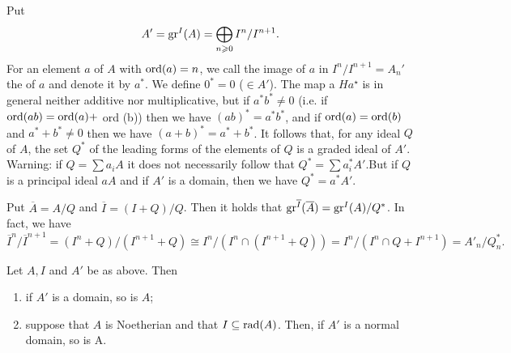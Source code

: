 \documentclass[../main]{subfiles}
\begin{document}
Put \[A'=\operatorname{gr}^I(A) = \bigoplus_{n\geqslant 0} I^n/I^{n+1}.\] For an element $a$ of $A$ with $\operatorname{ord}(a)=n$, we call the image of $a$ in $I^n / I^{n+1}=A_n'$ the  of $a$ and denote it by $a^{\ast}$. We define $0^{\ast}=0$ ($\in A'$). The map a $H a^{\star}$ is in general neither additive nor multiplicative, but if $a^{\ast} b^{\ast} \neq 0$ (i.e. if $\operatorname{ord}(a b)=\operatorname{ord}(a)+$ ord (b)) then we have $(a b)^\ast=a^\ast b^\ast$, and if $\operatorname{ord}(a)=\operatorname{ord}(b)$ and $a^{\ast}+b^{\ast} \neq 0$ then we have $(a+b)^{\ast}=a^{\ast}+b^{\ast}$. It follows that, for any ideal $Q$ of $A$, the set $Q^{\ast}$ of the leading forms of the elements of $Q$ is a graded ideal of $A'$. Warning: if $Q=\sum a_iA$ it does not necessarily follow that $Q^{\ast}=\sum a_i^{\ast} A'$.But if $Q$ is a principal ideal $aA$ and if $A'$ is a domain, then we have $Q^{\ast}=a^{\ast} A'$.

Put $\overline{A} = A/Q$ and $\overline{I}= (I+Q)/Q$. Then it holds that $\operatorname{gr}^{\overline{I}}(\overline{A}) = \operatorname{gr}^I(A)/Q^\ast$. In fact, we have \[\overline{I}^n/\overline{I}^{n+1}=(I^n+Q)/(I^{n+1}+Q)\cong I^n/(I^n\cap (I^{n+1}+Q))= I^n/(I^n\cap Q+ I^{n+1}) = A'_n/Q^\ast_n.\] 


\begin{partheorem}[Krull]\label{thm:034}
 Let $A, I$ and $A'$ be as above. Then
 \begin{enumerate}
     \item if $A'$ is a domain, so is $A$;
     \item suppose that $A$ is Noetherian and that $I \subseteq \operatorname{rad}(A)$. Then, if $A'$ is a normal domain, so is A.
 \end{enumerate}
\end{partheorem}
\end{document}
